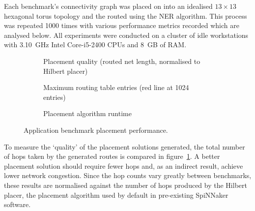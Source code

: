 				Each benchmark's connectivity graph was placed on into an idealised $13
				\times 13$ hexagonal torus topology and the routed using the NER
				algorithm. This process was repeated \num{1000} times with various
				performance metrics recorded which are analysed below. All experiments
				were conducted on a cluster of idle workstations with 3.10~GHz Intel
				Core-i5-2400 CPUs and 8~GB of RAM.
			
				\begin{figure}
					\center
					\begin{subfigure}{\linewidth}
						\center
						
						\caption{Placement quality (routed net length, normalised to
						Hilbert placer)}
						\label{fig:application-benchmarks-quality}
					\end{subfigure}
					
					\vspace*{1em}
					
					\begin{subfigure}{\linewidth}
						\center
						
						\caption{Maximum routing table entries (red line at \num{1024} entries)}
						\label{fig:application-benchmarks-tables}
					\end{subfigure}
					
					\vspace*{1em}
					
					\begin{subfigure}{\linewidth}
						\center
						
						\caption{Placement algorithm runtime}
						\label{fig:application-benchmarks-runtime}
					\end{subfigure}
					
					\caption{Application benchmark placement performance.}
					\label{fig:application-benchmarks}
				\end{figure}
				
				To measure the `quality' of the placement solutions generated, the
				total number of hops taken by the generated routes is compared in
				figure~\ref{fig:application-benchmarks-quality}. A better placement
				solution should require fewer hops and, as an indirect result, achieve
				lower network congestion.  Since the hop counts vary greatly between
				benchmarks, these results are normalised against the number of hops
				produced by the Hilbert placer, the placement algorithm used by default
				in pre-existing SpiNNaker software.
				

